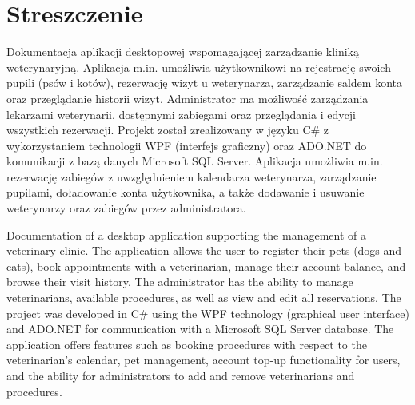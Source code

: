 \chapter{Streszczenie}

Dokumentacja aplikacji desktopowej wspomagającej zarządzanie kliniką 
weterynaryjną. Aplikacja m.in. umożliwia użytkownikowi na rejestrację swoich 
pupili (psów i kotów), rezerwację wizyt u weterynarza, zarządzanie 
saldem konta oraz przeglądanie historii wizyt. Administrator ma 
możliwość zarządzania lekarzami weterynarii, dostępnymi zabiegami 
oraz przeglądania i edycji wszystkich rezerwacji. Projekt został 
zrealizowany w języku C\# z wykorzystaniem technologii WPF 
(interfejs graficzny) oraz ADO.NET do komunikacji z 
bazą danych Microsoft SQL Server. Aplikacja umożliwia m.in. 
rezerwację zabiegów z uwzględnieniem kalendarza weterynarza, 
zarządzanie pupilami, doładowanie konta użytkownika, a także 
dodawanie i usuwanie weterynarzy oraz zabiegów przez administratora.

\vspace{15pt}

Documentation of a desktop application supporting the management of a veterinary clinic. The application allows the user to register their pets 
(dogs and cats), book appointments with a veterinarian, manage their account balance, and browse their visit history. The administrator has the 
ability to manage veterinarians, available procedures, as well as view and edit all reservations.
The project was developed in C\# using the WPF technology (graphical user interface) and ADO.NET for communication with a Microsoft 
SQL Server database. The application offers features such as booking procedures with respect to the veterinarian's calendar, pet 
management, account top-up functionality for users, and the ability for administrators to add and remove veterinarians and procedures.